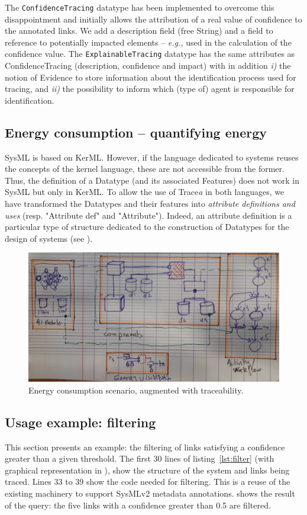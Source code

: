 The \texttt{ConfidenceTracing} datatype has been implemented to overcome this disappointment and initially allows the attribution of a real value of confidence to the annotated links. We add a description field (free String) and a field to reference to potentially impacted elements -- \textit{e.g.,} used in the calculation of the confidence value.
The \texttt{ExplainableTracing} datatype has the same attributes as ConfidenceTracing (description, confidence and impact) with in addition \textit{i)} the notion of Evidence to store information about the identification process used for tracing, and \textit{ii)} the possibility to inform which (type of) agent is responsible for identification.

\subsection{Energy consumption -- quantifying energy}\label{sec:energy}
SysML is based on KerML. However, if the language dedicated to systems reuses the concepts of the kernel language, these are not accessible from the former. Thus, the definition of a Datatype (and its associated Features) does not work in SysML but only in KerML. To allow the use of Trace\textit{a} in both languages, we have transformed the Datatypes and their features into \textit{attribute definitions and uses} (resp. "Attribute def" and "Attribute"). Indeed, an attribute definition is a particular type of structure dedicated to the construction of Datatypes for the design of systems (see ).


\begin{figure}[ht]      
	\centering 
	\includegraphics[width=.5\linewidth]{images/scenario-energy-ML.jpg}
	\caption{Energy consumption scenario, augmented with traceability.}
	\label{fig:energy}
\end{figure}

\subsection{Usage example: filtering}\label{sec:filter}
This section presents an example: the filtering of links satisfying a confidence greater than a given threshold.
The first 30 lines of listing~\ref{lst:filter} (with graphical representation in ), show the structure of the system and links being traced. Lines 33 to 39 show the code needed for filtering. This is a reuse of the existing machinery to support SysMLv2 metadata annotations.  shows the result of the query: the five links with a confidence greater than 0.5 are filtered.

